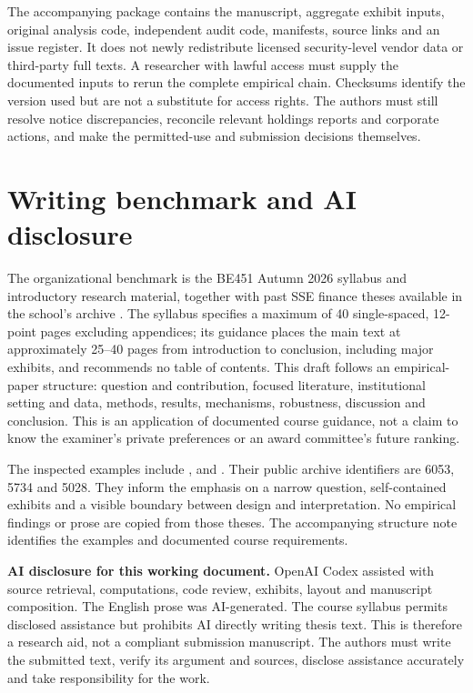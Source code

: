 The accompanying package contains the manuscript, aggregate exhibit inputs, original analysis code, independent audit code, manifests, source links and an issue register. It does not newly redistribute licensed security-level vendor data or third-party full texts. A researcher with lawful access must supply the documented inputs to rerun the complete empirical chain. Checksums identify the version used but are not a substitute for access rights. The authors must still resolve notice discrepancies, reconcile relevant holdings reports and corporate actions, and make the permitted-use and submission decisions themselves.

\section{Writing benchmark and AI disclosure}
\label{app:disclosure}

The organizational benchmark is the BE451 Autumn 2026 syllabus and introductory research material, together with past SSE finance theses available in the school's archive \citep{sse2026}. The syllabus specifies a maximum of 40 single-spaced, 12-point pages excluding appendices; its guidance places the main text at approximately 25--40 pages from introduction to conclusion, including major exhibits, and recommends no table of contents. This draft follows an empirical-paper structure: question and contribution, focused literature, institutional setting and data, methods, results, mechanisms, robustness, discussion and conclusion. This is an application of documented course guidance, not a claim to know the examiner's private preferences or an award committee's future ranking.

The inspected examples include \citet{fager2024}, \citet{holst2023} and \citet{domeij2021}. Their public archive identifiers are 6053, 5734 and 5028. They inform the emphasis on a narrow question, self-contained exhibits and a visible boundary between design and interpretation. No empirical findings or prose are copied from those theses. The accompanying structure note identifies the examples and documented course requirements.

\textbf{AI disclosure for this working document.} OpenAI Codex assisted with source retrieval, computations, code review, exhibits, layout and manuscript composition. The English prose was AI-generated. The course syllabus permits disclosed assistance but prohibits AI directly writing thesis text. This is therefore a research aid, not a compliant submission manuscript. The authors must write the submitted text, verify its argument and sources, disclose assistance accurately and take responsibility for the work.
